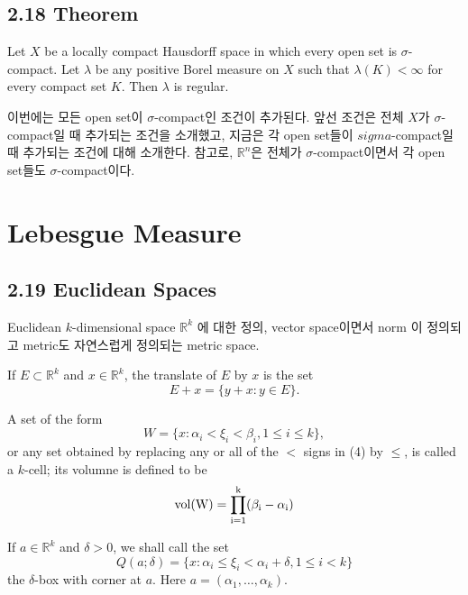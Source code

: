 \documentclass[11pt,reqno]{amsart}
\renewcommand{\(}{\left(}
\renewcommand{\)}{\right)}
\renewcommand{\[}{\left[}
\renewcommand{\]}{\right]}
\newcommand{\R}{\mathbb{R}}
\begin{document}
\subsection{2.18 Theorem}

Let $X$ be a locally compact Hausdorff space in which every open set is $\sigma$-compact. Let $\lambda$ be any positive Borel measure on $X$ 
such that $\lambda (K) < \infty$ for every compact set $K$. Then $\lambda$ is regular.

이번에는 모든 open set이 $\sigma$-compact인 조건이 추가된다. 앞선 조건은 전체 $X$가 $\sigma$-compact일 때 추가되는 조건을 소개했고, 지금은 각 open set들이 
$sigma$-compact일 때 추가되는 조건에 대해 소개한다. 참고로, $\R^n$은 전체가 $\sigma$-compact이면서 각 open set들도 $\sigma$-compact이다.

\section{Lebesgue Measure}

\subsection{2.19 Euclidean Spaces}

Euclidean $k$-dimensional space $\R^k$ 에 대한 정의, vector space이면서 norm 이 정의되고 metric도 자연스럽게 정의되는 metric space.

If $E \subset \R^k$ and $x \in \R^k$, the translate of $E$ by $x$ is the set 
\begin{equation}
  E + x = \{ y + x : y \in E \}.
\end{equation}

A set of the form 
\begin{equation}
  W = \{ x : \alpha _i < \xi_i < \beta _i , 1 \le i \le k \},
\end{equation}
or any set obtained by replacing any or all of the $<$ signs in (4) by $\le$, is called a $k$-cell; its volumne is defined to be
\begin{equation}
  \rm vol (W) = \prod_{i=1}^k (\beta_i - \alpha_i)
\end{equation}

If $a \in \R^k$ and $\delta > 0$, we shall call the set 
\begin{equation}
  Q(a; \delta) = \{ x : \alpha_i \le \xi_i < \alpha_i + \delta, 1 \le i < k \}
\end{equation}
the $\delta$-box with corner at $a$. Here $a = (\alpha_1, \dots, \alpha_k)$.
\end{document}
